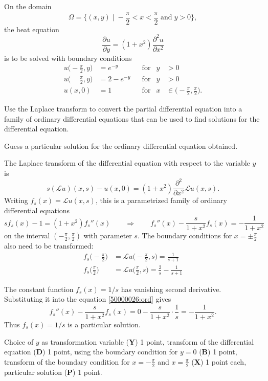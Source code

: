 On the domain
\[
\Omega
=
\biggl\{(x,y)
\;\bigg|\;
-\frac{\pi}2 < x < \frac{\pi}2
\;\text{and}\;
y>0
\biggr\},
\]
the heat equation
\[
\frac{\partial u}{\partial y}
=
(1+x^2)
\frac{\partial^2 u}{\partial x^2}
\]
is to be solved with boundary conditions
\[
\begin{aligned}
u\biggl(-\frac{\pi}2,y\biggr)           &= e^{-y}   &&\text{for}& y&>0\\
u\biggl(\phantom{-}\frac{\pi}2,y\biggr) &= 2-e^{-y} &&\text{for}& y&>0\\
u(x,0)                                  &= 1        &&\text{for}& x&\in\biggl(-\frac{\pi}2,\frac{\pi}2\biggr).
\end{aligned}
\]
\begin{teilaufgaben}
\item
Use the Laplace transform to convert the partial differential equation
into a family of ordinary differential equations that can be used to
find solutions for the differential equation.
\item
Guess a particular solution for the ordinary differential equation obtained.
\end{teilaufgaben}

\begin{loesung}
\begin{teilaufgaben}
\item
The Laplace transform of the differential equation with respect to
the variable $y$ is
\[
s (\mathscr{L}u)(x,s) - u(x,0)
=
(1+x^2)\frac{\partial^2}{\partial x^2}
\mathscr{L}u(x,s).
\]
Writing $f_s(x) = \mathscr{L}u(x,s)$, this is a parametrized
family of ordinary differential equations
\begin{equation}
sf_s(x) - 1 = (1+x^2)f_s''(x)
\qquad\Rightarrow\qquad
f_s''(x)-\frac{s}{1+x^2}f_s(x)
=
-
\frac{1}{1+x^2}
\label{50000026:ord}
\end{equation}
on the interval $(-\frac{\pi}2,\frac{\pi}2)$ with parameter $s$.
The boundary conditions for $x=\pm\frac{\pi}2$ also need to be 
transformed:
\begin{align*}
f_s\biggl(-\frac{\pi}2\biggr)
&=
\mathscr{L}u\biggl(-\frac{\pi}2,s\biggr) = \frac{1}{s+1}
\\
f_s\biggl(\frac{\pi}2\biggr)
&=
\mathscr{L}u\biggl(\frac{\pi}2,s\biggr)  = \frac{2}{s} - \frac{1}{s+1}
\end{align*}
\item
The constant function $f_s(x)=1/s$ has vanishing second derivative.
Substituting it into the equation \eqref{50000026:ord} gives
\[
f_s''(x) - \frac{s}{1+x^2}f_s(x)
=
0
-\frac{s}{1+x^2}\cdot\frac{1}s
=
-
\frac{1}{1+x^2}.
\]
Thus $f_s(x)=1/s$ is a particular solution.
\qedhere
\end{teilaufgaben}
\end{loesung}

\begin{bewertung}
Choice of $y$ as transformation variable ({\bf Y}) 1 point,
transform of the differential equation ({\bf D}) 1 point,
using the boundary condition for $y=0$ ({\bf B}) 1 point,
transform of the boundary condition for $x=-\frac{\pi}2$
and $x=\frac{\pi}2$ ({\bf X}) 1 point each,
particular solution ({\bf P}) 1 point.
\end{bewertung}
